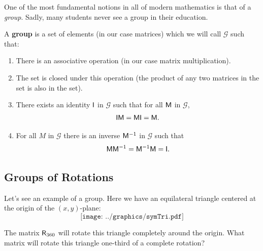 \documentclass{ximera}
\begin{document}
One of the most fundamental notions in all of modern mathematics is
that of a \textit{group}. Sadly, many students never see a group in their
education.

\begin{dfn}
A \textbf{group} is a set of elements (in our case matrices) which we
will call $\mathcal{G}$ such that: 
\begin{enumerate}
\item There is an associative operation (in our case matrix multiplication).
\item The set is closed under this operation (the product of any two
  matrices in the set is also in the set).
\item There exists an identity $\mathsf{I}$ in $\mathcal{G}$ such that for all $\mathsf{M}$ in $\mathcal{G}$, 
\[
\mathsf{I}\mathsf{M}=\mathsf{M}\mathsf{I} = \mathsf{M}.
\]
\item For all $M$ in $\mathcal{G}$ there is an inverse $\mathsf{M}^{-1}$ in $\mathcal{G}$ such that 
\[
\mathsf{M} \mathsf{M}^{-1}= \mathsf{M}^{-1}\mathsf{M}= \mathsf{I}.
\]
\end{enumerate}
\end{dfn}


\subsection{Groups of Rotations}


Let's see an example of a group. Here we have an equilateral triangle centered at
the origin of the $(x,y)$-plane:
\[
\texttt{[image: ../graphics/symTri.pdf]}
\]
\begin{ques}
The matrix $\mathsf{R}_{360}$ will rotate this triangle completely
around the origin. What matrix will rotate this triangle one-third of
a complete rotation?
\end{ques}
\end{document}

